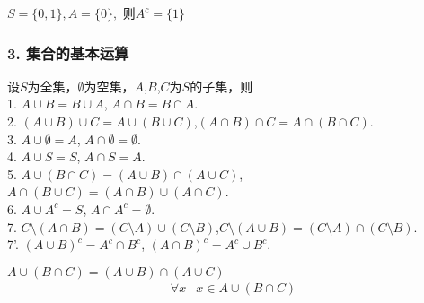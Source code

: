 \documentclass{beamer}
\begin{document}
\begin{CJK*}{UTF8}{gbsn}
\begin{frame}
\begin{minipage}{0.69\linewidth}
\begin{Def}
  \end{Def}\pause
\end{minipage}
\begin{minipage}{0.29\linewidth}
  \end{minipage}\pause
    \begin{Ex}
        $S = \{0,1\}, A =  \{0\},$ 则$A^c = \{1\}$
    \end{Ex}
\end{frame}


\begin{frame}
  \frametitle{3. 集合的基本运算}
  \begin{Thm}
设$S$为全集，$\emptyset$为空集，$A$,$B$,$C$为$S$的子集，则\\
1. $A \cup B = B \cup A$, $A \cap B = B \cap A$.\\
2. $(A \cup B) \cup C = A \cup (B \cup C)$,$(A \cap B) \cap C = A \cap (B \cap C)$.\\
3. $A \cup \emptyset = A$, $A \cap \emptyset = \emptyset$.\\
4. $A \cup S = S$, $A \cap S = A$.\\
5. $A \cup (B \cap C) = (A \cup B) \cap (A \cup C)$, $A \cap (B \cup C) = (A \cap B) \cup (A \cap C)$.\\
6. $A \cup A^c = S$, $A \cap A^c = \emptyset$.\\
7. $C \setminus (A \cap B) = (C \setminus A) \cup (C \setminus B)$,$C\setminus (A \cup B) = (C \setminus A) \cap (C \setminus B)$.\\ 
7'. $(A \cup B)^c = A^c \cap B^c$, $(A \cap B)^c = A^c \cup B^c$.\\
  \end{Thm}
\end{frame}
\begin{frame}
  $A \cup (B \cap C) = (A \cup B) \cap (A \cup C)$
  \pause
  \begin{equation*}
    \begin{split}
      \forall x &x \in A \cup (B \cap C) \\

\end{split}
\end{equation*}
\end{frame}
\end{CJK*}
\end{document}
